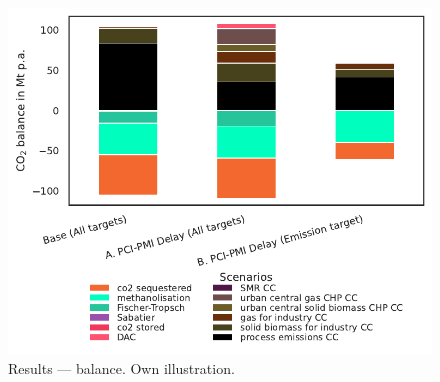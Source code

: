 \documentclass[final,5p,times,twocolumn]{elsarticle}
\begin{document}
\begin{figure}[h]
  \centering
  \includegraphics[width=\linewidth]{co2_balance}
  \caption{Results ---  balance. Own illustration.}
  \label{fig:co2_balance}
\end{figure}
\end{document}
